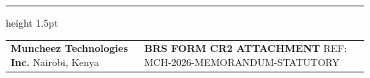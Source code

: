 \documentclass[11pt,a4paper]{article}
\begin{document}
\vfill

\color{RuleNavy}\hrule height 1.5pt
\vspace{0.3cm}

\begin{tabularx}{\textwidth}{@{} X >{\raggedleft\arraybackslash}X @{}}
    \textsf{\small\bfseries\color{CorporateNavy} Muncheez Technologies Inc.} \newline
    \textsf{\scriptsize\color{SolidBlack} Nairobi, Kenya} &
    \textsf{\small\bfseries\color{CorporateNavy} BRS FORM CR2 ATTACHMENT} \newline
    \textsf{\scriptsize\color{SolidBlack} REF: MCH-2026-MEMORANDUM-STATUTORY} \\
\end{tabularx}
\end{document}
